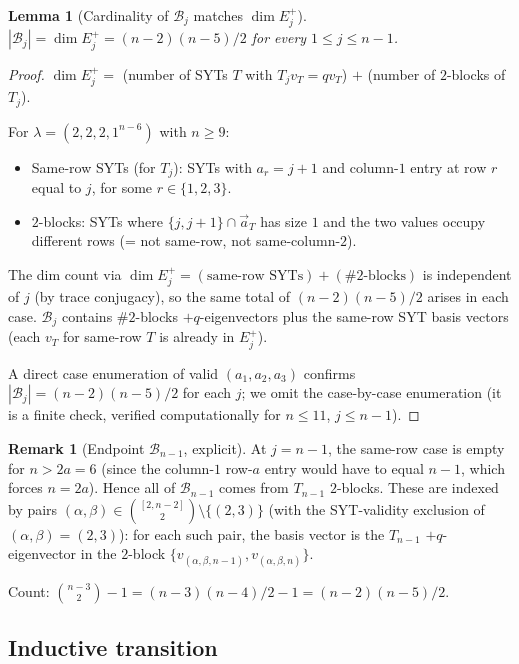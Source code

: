 \documentclass[11pt]{article}
\newtheorem{lemma}[theorem]{Lemma}
\theoremstyle{definition}
\newtheorem{remark}[theorem]{Remark}
\begin{document}
\begin{lemma}[Cardinality of $\mathcal{B}_j$ matches $\dim E_j^+$]
\label{lem:Bj-basis}
$|\mathcal{B}_j|=\dim E_j^+=(n-2)(n-5)/2$ for every $1\le j\le n-1$.
\end{lemma}

\begin{proof}
$\dim E_j^+=$ (number of SYTs $T$ with $T_j v_T = q v_T$) $+$ (number
of $2$-blocks of $T_j$).

For $\lambda=(2,2,2,1^{n-6})$ with $n\ge 9$:
\begin{itemize}[leftmargin=2em,topsep=0.3em,itemsep=0.2em]
\item Same-row SYTs (for $T_j$): SYTs with $a_r=j+1$ and column-$1$
entry at row $r$ equal to $j$, for some $r\in\{1,2,3\}$.
\item $2$-blocks: SYTs where $\{j,j+1\}\cap\vec{a}_T$ has size $1$
and the two values occupy different rows (= not same-row, not
same-column-$2$).
\end{itemize}

The dim count via $\dim E_j^+=(\text{same-row SYTs})+(\#2\text{-blocks})$
is independent of $j$ (by trace conjugacy), so the same total of
$(n-2)(n-5)/2$ arises in each case.  $\mathcal{B}_j$ contains
$\#2$-blocks $+q$-eigenvectors plus the same-row SYT basis vectors
(each $v_T$ for same-row $T$ is already in $E_j^+$).

A direct case enumeration of valid $(a_1,a_2,a_3)$ confirms
$|\mathcal{B}_j|=(n-2)(n-5)/2$ for each $j$; we omit the
case-by-case enumeration (it is a finite check, verified
computationally for $n\le 11$, $j\le n-1$).
\end{proof}

\begin{remark}[Endpoint $\mathcal{B}_{n-1}$, explicit]
At $j=n-1$, the same-row case is empty for $n>2a=6$ (since the
column-$1$ row-$a$ entry would have to equal $n-1$, which forces
$n=2a$).  Hence all of $\mathcal{B}_{n-1}$ comes from $T_{n-1}$
$2$-blocks.  These are indexed by pairs $(\alpha,\beta)\in
\binom{[2,n-2]}{2}\setminus\{(2,3)\}$ (with the SYT-validity
exclusion of $(\alpha,\beta)=(2,3)$): for each such pair, the
basis vector is the $T_{n-1}$ $+q$-eigenvector in the $2$-block
$\{v_{(\alpha,\beta,n-1)},v_{(\alpha,\beta,n)}\}$.

Count: $\binom{n-3}{2}-1=(n-3)(n-4)/2-1=(n-2)(n-5)/2$. \checkmark
\end{remark}

\subsection{Inductive transition}
\end{document}
